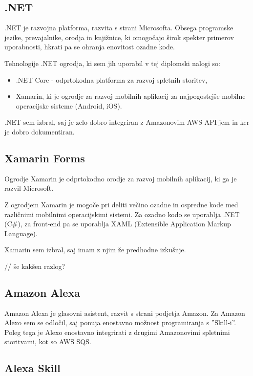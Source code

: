 \documentclass[a4paper, 12pt]{book}
\begin{document}
\subsection{.NET}

.NET je razvojna platforma, razvita s strani Microsofta.
Obsega programske jezike, prevajalnike, orodja in knjižnice, ki omogočajo širok spekter primerov uporabnosti, hkrati pa se ohranja enovitost ozadne kode.

Tehnologije .NET ogrodja, ki sem jih uporabil v tej diplomski nalogi so:
\begin{itemize}
	\item .NET Core - odprtokodna platforma za razvoj spletnih storitev,
	\item Xamarin, ki je ogrodje za razvoj mobilnih aplikacij za najpogostejše mobilne operacijske sisteme (Android, iOS).
\end{itemize}

.NET sem izbral, saj je zelo dobro integriran z Amazonovim AWS API-jem in ker je dobro dokumentiran.

\subsection{Xamarin Forms}

Ogrodje Xamarin je odprtokodno orodje za razvoj mobilnih aplikacij, ki ga je razvil Microsoft. 

Z ogrodjem Xamarin je mogoče pri deliti večino ozadne in ospredne kode med različnimi mobilnimi operacijskimi sistemi. 
Za ozadno kodo se uporablja .NET (C\#), za front-end pa se uporablja XAML (Extensible Application Markup Language).

Xamarin sem izbral, saj imam z njim že predhodne izkušnje.

// še kakšen razlog?

\subsection{Amazon Alexa}

Amazon Alexa je glasovni asistent, razvit s strani podjetja Amazon.
Za Amazon Alexo sem se odločil, saj ponuja enostavno možnost programiranja s ''Skill-i''.
Poleg tega je Alexo enostavno integrirati z drugimi Amazonovimi spletnimi storitvami, kot so AWS SQS.

\subsection{Alexa Skill}
\end{document}
